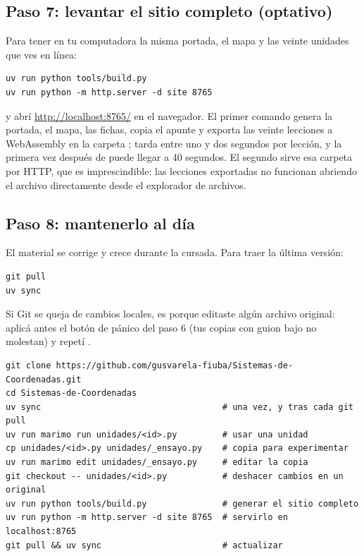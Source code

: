 \documentclass[11pt,a4paper]{report}
\newcommand{\clave}[1]{\texttt{\detokenize{#1}}}
\begin{document}
\subsection{Paso 7: levantar el sitio completo (optativo)}

Para tener en tu computadora la misma portada, el mapa y las veinte unidades que ves en línea:
\begin{lstlisting}[style=terminal]
uv run python tools/build.py
uv run python -m http.server -d site 8765
\end{lstlisting}
y abrí \url{http://localhost:8765/} en el navegador. El primer comando genera la portada, el mapa, las fichas, copia el apunte y exporta las veinte lecciones a WebAssembly en la carpeta ; tarda entre uno y dos segundos por lección, y la primera vez después de \clave{uv sync} puede llegar a 40 segundos. El segundo sirve esa carpeta por HTTP, que es imprescindible: las lecciones exportadas no funcionan abriendo el archivo  directamente desde el explorador de archivos.

\subsection{Paso 8: mantenerlo al día}

El material se corrige y crece durante la cursada. Para traer la última versión:
\begin{lstlisting}[style=terminal]
git pull
uv sync
\end{lstlisting}
Si Git se queja de cambios locales, es porque editaste algún archivo original: aplicá antes el botón de pánico del paso 6 (tus copias con guion bajo no molestan) y repetí \clave{git pull}.

\begin{resultado}
\begin{lstlisting}[style=terminal]
git clone https://github.com/gusvarela-fiuba/Sistemas-de-Coordenadas.git
cd Sistemas-de-Coordenadas
uv sync                                    # una vez, y tras cada git pull
uv run marimo run unidades/<id>.py         # usar una unidad
cp unidades/<id>.py unidades/_ensayo.py    # copia para experimentar
uv run marimo edit unidades/_ensayo.py     # editar la copia
git checkout -- unidades/<id>.py           # deshacer cambios en un original
uv run python tools/build.py               # generar el sitio completo
uv run python -m http.server -d site 8765  # servirlo en localhost:8765
git pull && uv sync                        # actualizar
\end{lstlisting}
\end{resultado}
\end{document}
